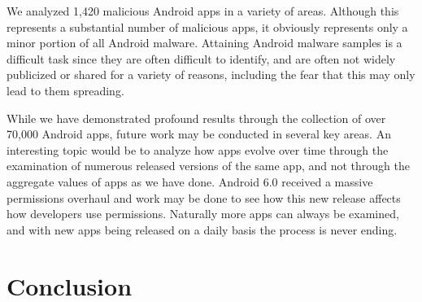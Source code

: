 \documentclass{llncs}
\begin{document}
We analyzed 1,420 malicious Android apps in a variety of areas. Although this represents a substantial number of malicious apps, it obviously represents only a minor portion of all Android malware. Attaining Android malware samples is a difficult task since they are often difficult to identify, and are often not widely publicized or shared for a variety of reasons, including the fear that this may only lead to them spreading.



While we have demonstrated profound results through the collection of over 70,000 Android apps, future work may be conducted in several key areas. An interesting topic would be to analyze how apps evolve over time through the examination of numerous released versions of the same app, and not through the aggregate values of apps as we have done. Android 6.0 received a massive permissions overhaul and work may be done to see how this new release affects how developers use permissions. Naturally more apps can always be examined, and with new apps being released on a daily basis the process is never ending.











\section{Conclusion}
\label{sec: conclusion}
\end{document}
